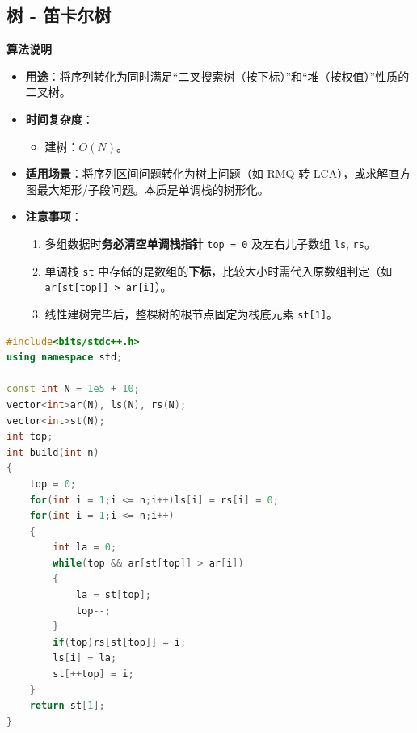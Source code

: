 \documentclass[10pt,landscape,a4paper]{article}
\begin{document}
\begin{multicols*}{3}
\subsection*{树 - 笛卡尔树}
\par\addvspace{0.7ex}\noindent\textbf{算法说明}\par\nobreak
\begin{itemize}
\item \textbf{用途}：将序列转化为同时满足“二叉搜索树（按下标）”和“堆（按权值）”性质的二叉树。
\item \textbf{时间复杂度}：
\begin{itemize}
\item 建树：$O(N)$。
\end{itemize}
\item \textbf{适用场景}：将序列区间问题转化为树上问题（如 RMQ 转 LCA），或求解直方图最大矩形/子段问题。本质是单调栈的树形化。
\item \textbf{注意事项}：
\begin{enumerate}[start=1]
\item 多组数据时\textbf{务必清空单调栈指针} \texttt{t\allowbreak{}o\allowbreak{}p\allowbreak{} \allowbreak{}=\allowbreak{} \allowbreak{}0} 及左右儿子数组 \texttt{l\allowbreak{}s}, \texttt{r\allowbreak{}s}。
\item 单调栈 \texttt{s\allowbreak{}t} 中存储的是数组的\textbf{下标}，比较大小时需代入原数组判定（如 \texttt{a\allowbreak{}r\allowbreak{}[\allowbreak{}s\allowbreak{}t\allowbreak{}[\allowbreak{}t\allowbreak{}o\allowbreak{}p\allowbreak{}]\allowbreak{}]\allowbreak{} \allowbreak{}\textgreater{}\allowbreak{} \allowbreak{}a\allowbreak{}r\allowbreak{}[\allowbreak{}i\allowbreak{}]}）。
\item 线性建树完毕后，整棵树的根节点固定为栈底元素 \texttt{s\allowbreak{}t\allowbreak{}[\allowbreak{}1\allowbreak{}]}。
\end{enumerate}
\end{itemize}
\par{}\par
\begin{lstlisting}[language=C++]
#include<bits/stdc++.h>
using namespace std;

const int N = 1e5 + 10;
vector<int>ar(N), ls(N), rs(N);
vector<int>st(N);
int top;
int build(int n)
{
    top = 0;
    for(int i = 1;i <= n;i++)ls[i] = rs[i] = 0;
    for(int i = 1;i <= n;i++)
    {
        int la = 0;
        while(top && ar[st[top]] > ar[i])
        {
            la = st[top];
            top--;
        }
        if(top)rs[st[top]] = i;
        ls[i] = la;
        st[++top] = i;
    }
    return st[1];
}
\end{lstlisting}

\end{multicols*}
\end{document}
